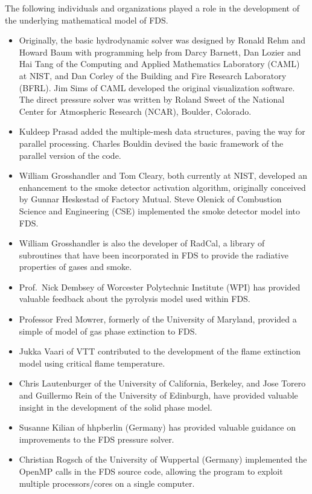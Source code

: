 \documentclass[11pt]{book}
\begin{document}
The following individuals and organizations played a role in the development of the underlying mathematical model of FDS.
\begin{itemize}
\item Originally, the basic hydrodynamic solver was designed by Ronald Rehm
and Howard Baum with programming help from Darcy Barnett, Dan Lozier
and Hai Tang of the Computing and Applied Mathematics Laboratory
(CAML) at NIST, and Dan Corley of the Building and Fire Research
Laboratory (BFRL). Jim Sims of CAML developed the original
visualization software.  The direct pressure solver was written by
Roland Sweet of the National Center for Atmospheric Research (NCAR),
Boulder, Colorado.
\item Kuldeep Prasad added the multiple-mesh data
structures, paving the way for parallel processing.   Charles Bouldin
devised the basic framework of the parallel version of the code.
\item William Grosshandler and Tom Cleary, both currently at NIST, developed
an enhancement to the smoke detector activation algorithm, originally
conceived by Gunnar Heskestad of Factory Mutual. Steve
Olenick of Combustion Science and Engineering (CSE) implemented the
smoke detector model into FDS.
\item William Grosshandler is also the developer of RadCal, a library of
subroutines that have been incorporated in FDS to provide the
radiative properties of gases and smoke.
\item Prof.~Nick Dembsey of Worcester Polytechnic Institute (WPI) has provided valuable feedback about the pyrolysis model used within FDS.
\item Professor Fred Mowrer, formerly of the University of Maryland, provided a simple
of model of gas phase extinction to FDS.
\item Jukka Vaari of VTT contributed to the development of the flame extinction model using critical flame temperature.
\item Chris Lautenburger of the University of California, Berkeley, and Jose Torero and Guillermo Rein of the University of Edinburgh, have
provided valuable insight in the development of the solid phase model.
\item Susanne Kilian of hhpberlin (Germany) has provided valuable guidance on improvements to the FDS pressure solver.
\item Christian Rogsch of the University of Wuppertal (Germany) implemented the OpenMP calls in the FDS source code, allowing the program to
exploit multiple processors/cores on a single computer.
\end{itemize}
\end{document}

